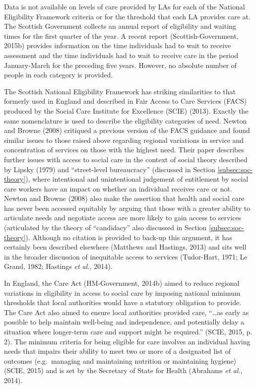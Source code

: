 \documentclass[12pt,a4paper,oneside,table]{report}
\begin{document}
Data is not available on levels of care provided by LAs for each of the
National Eligibility Framework criteria or for the threshold that each
LA provides care at. The Scottish Government collects an annual report
of eligibility and waiting times for the first quarter of the year. A
recent report (Scottish-Government, 2015b) provides information on the
time individuals had to wait to receive assessment and the time
individuals had to wait to receive care in the period January-March for
the preceding five years. However, no absolute number of people in each
category is provided.

The Scottish National Eligibility Framework has striking similarities to
that formerly used in England and described in Fair Access to Care
Services (FACS) produced by the Social Care Institute for Excellence
(SCIE) (2013). Exactly the same nomenclature is used to describe the
eligibility categories of need. Newton and Browne (2008) critiqued a
previous version of the FACS guidance and found similar issues to those
raised above regarding regional variations in service and concentration
of services on those with the highest need. Their paper describes
further issues with access to social care in the context of social
theory described by Lipsky (1979) and ``street-level bureaucracy''
(discussed in Section \ref{subsec:soc-theory}), where intentional and
unintentional judgement of entitlement by social care workers have an
impact on whether an individual receives care or not. Newton and Browne
(2008) also make the assertion that health and social care has never
been accessed equitably by arguing that those with a greater ability to
articulate needs and negotiate access are more likely to gain access to
services (articulated by the theory of ``candidacy'' also discussed in
Section \ref{subsec:soc-theory}). Although no citation is provided to
back-up this argument, it has certainly been described elsewhere
(Matthews and Hastings, 2013) and sits well in the broader discussion of
inequitable access to services (Tudor-Hart, 1971; Le Grand, 1982;
Hastings \emph{et al.}, 2014).

In England, the Care Act (HM-Government, 2014b) aimed to reduce regional
variations in eligibility in access to social care by imposing national
minimum thresholds that local authorities would have a statutory
obligation to provide. The Care Act also aimed to ensure local
authorities provided care, ``\ldots as early as possible to help
maintain well-being and independence, and potentially delay a situation
where longer-term care and support might be required.'' (SCIE, 2015, p.
2). The minimum criteria for being eligible for care involves an
individual having needs that impairs their ability to meet two or more
of a designated list of outcomes (e.g.~managing and maintaining
nutrition or maintaining hygiene) (SCIE, 2015) and is set by the
Secretary of State for Health (Abrahams \emph{et al.}, 2014).
\end{document}
